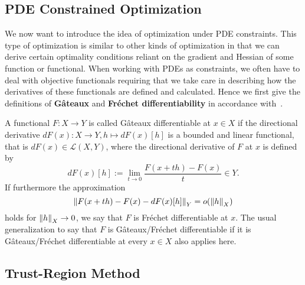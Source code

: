 \subsection{PDE Constrained Optimization}

We now want to introduce the idea of optimization under PDE constraints.
This type of optimization is similar to other kinds of optimization in that we can derive certain optimality conditions reliant on the gradient and Hessian of some function or functional.
When working with PDEs as constraints, we often have to deal with objective functionals requiring that we take care in describing how the derivatives of these functionals are defined and calculated.
Hence we first give the definitions of \textbf{G\^{a}teaux} and \textbf{Fr\'{e}chet differentiability} in accordance with~\cite[Section 1.4]{Hinze2009}.

A functional $F: X \rightarrow Y$ is called G\^{a}teaux differentiable at $x \in X$ if the directional derivative $dF(x): X \rightarrow Y, h \mapsto dF (x) [ h ]$ is a bounded and linear functional, that is $dF(x) \in \mathcal{L}(X, Y)$, where the directional derivative of $F$ at $x$ is defined by
\begin{equation*}\label{DirDeriv}
    dF(x)[h] := \lim\limits_{t \rightarrow 0} \frac{F(x + th) - F(x)}{t} \in Y.
\end{equation*}
If furthermore the approximation
\begin{equation*}\label{FrechDeriv}
    \norm[Y]{F(x + th) - F(x) - dF(x)[h]} = o(\norm[X]{h})
\end{equation*}
holds for $\norm[X]{h} \rightarrow 0$, we say that $F$ is Fr\'{e}chet differentiable at $x$.
The usual generalization to say that $F$ is G\^{a}teaux/Fr\'{e}chet differentiable if it is G\^{a}teaux/Fr\'{e}chet differentiable at every $x \in X$ also applies here.



\subsection{Trust-Region Method}

